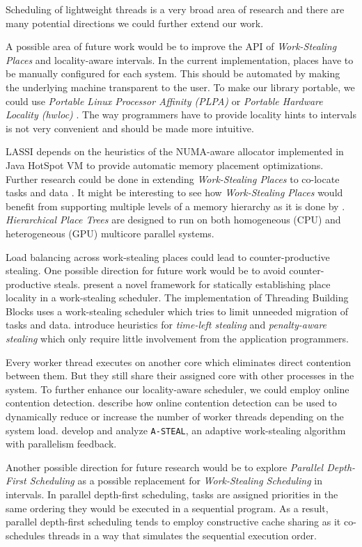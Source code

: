 Scheduling of lightweight threads is a very broad area of research and
there are many potential directions we could further extend our work.

A possible area of future work would be to improve the API of
\emph{Work-Stealing Places} and locality-aware intervals. In the
current implementation, places have to be manually configured for each
system. This should be automated by making the underlying machine
transparent to the user. To make our library portable, we could use
\emph{Portable Linux Processor Affinity (PLPA)} \cite{OpenMPI2010a} or
\emph{Portable Hardware Locality (hwloc)} \cite{OpenMPI2010}. The way
programmers have to provide locality hints to intervals is not very
convenient and should be made more intuitive.

LASSI depends on the heuristics of the NUMA-aware allocator
implemented in Java HotSpot VM to provide automatic memory placement
optimizations. Further research could be done in extending
\emph{Work-Stealing Places} to co-locate tasks and data \cite{HJ,
  Charles2005, Saraswat2010}. It might be interesting to see how
\emph{Work-Stealing Places} would benefit from supporting multiple
levels of a memory hierarchy as it is done by
\textcite{Yan2009}. \emph{Hierarchical Place Trees} are designed to
run on both homogeneous (CPU) and heterogeneous (GPU) multicore
parallel systems.

Load balancing across work-stealing places could lead to
counter-productive stealing. One possible direction for future work
would be to avoid counter-productive steals. \textcite{Agarwal2008}
present a novel framework for statically establishing place locality
in a work-stealing scheduler. The implementation of Threading Building
Blocks \cite{Contreras2008, Reinders2007} uses a work-stealing
scheduler which tries to limit unneeded migration of tasks and
data. \textcite{Gaud2010} introduce heuristics for \emph{time-left
  stealing} and \emph{penalty-aware stealing} which only require
little involvement from the application programmers.

Every worker thread executes on another core which eliminates direct
contention between them. But they still share their assigned core with
other processes in the system. To further enhance our locality-aware
scheduler, we could employ online contention
detection. \textcite{Mars2010} describe how online contention
detection can be used to dynamically reduce or increase the number of
worker threads depending on the system load. \textcite{Agrawal2007}
develop and analyze \lstinline!A-STEAL!, an adaptive work-stealing
algorithm with parallelism feedback.

Another possible direction for future research would be to explore
\emph{Parallel Depth-First Scheduling} as a possible replacement for
\emph{Work-Stealing Scheduling} in intervals. In parallel depth-first
scheduling, tasks are assigned priorities in the same ordering they
would be executed in a sequential program. As a result, parallel
depth-first scheduling tends to employ constructive cache sharing
\cite{Liaskovitis2006, Chen2007} as it co-schedules threads in a way
that simulates the sequential execution order.


